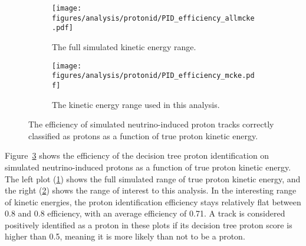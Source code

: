     \begin{figure}[h]
      \centering
      \begin{subfigure}[t]{2.8in}
        \texttt{[image: figures/analysis/protonid/PID\_efficiency\_allmcke.pdf]}
        \caption{The full simulated kinetic energy range.}
        \label{fig:pideffkeall}
      \end{subfigure}
      \hspace{2pt}
      \begin{subfigure}[t]{2.8in}
        \texttt{[image: figures/analysis/protonid/PID\_efficiency\_mcke.pdf]}
        \caption{The kinetic energy range used in this analysis.}
        \label{fig:pideffkerng}
      \end{subfigure}
      \caption{The efficiency of simulated neutrino-induced proton tracks
        correctly classified as protons as a function of true proton kinetic energy.}
      \label{fig:pideffke}
    \end{figure}
    Figure~\ref{fig:pideffke} shows the efficiency of the decision tree proton
    identification on simulated neutrino-induced protons as a function of true
    proton kinetic energy. The left plot (\ref{fig:pideffkeall}) shows the full
    simulated range of true proton kinetic energy, and the right
    (\ref{fig:pideffkerng}) shows the range of interest to this analysis. In
    the interesting range of kinetic energies, the proton identification
    efficiency stays relatively flat between 0.8 and 0.8 efficiency, with an
    average efficiency of 0.71. A track is considered positively identified as
    a proton in these plots if its decision tree proton score is higher than
    0.5, meaning it is more likely than not to be a proton.

